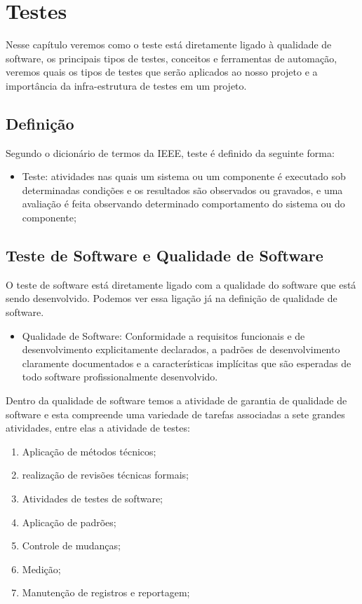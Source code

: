 \chapter{Testes}

Nesse capítulo veremos como o teste está diretamente ligado à qualidade de software, os principais tipos de testes, conceitos e ferramentas de automação, veremos quais os tipos de testes que serão aplicados ao nosso projeto e a importância da infra-estrutura de testes em um projeto.


\section{Definição}

Segundo o dicionário de termos da IEEE, teste é definido da seguinte forma:

\begin{itemize}
	\item Teste: atividades nas quais um sistema ou um componente é executado sob determinadas condições e os resultados são observados ou gravados, e uma avaliação é feita observando determinado comportamento do sistema ou do componente;
\end{itemize}

\section{Teste de Software e Qualidade de Software}

O teste de software está diretamente ligado com a qualidade do software que está sendo desenvolvido. Podemos ver essa ligação já na definição de qualidade de software.

\begin{itemize}
	\item Qualidade de Software: Conformidade a requisitos funcionais e de desenvolvimento explicitamente declarados, a padrões de desenvolvimento claramente documentados e a características implícitas que são esperadas de todo software profissionalmente desenvolvido.
\end {itemize}

Dentro da qualidade de software temos a atividade de garantia de qualidade de software e esta compreende uma variedade de tarefas associadas a sete grandes atividades, entre elas a atividade de testes:

\begin{enumerate}
	\item Aplicação de métodos técnicos;
	\item realização de revisões técnicas formais;
	\item Atividades de testes de software;
	\item Aplicação de padrões;
	\item Controle de mudanças;
	\item Medição;
	\item Manutenção de registros e reportagem;
\end{enumerate}

